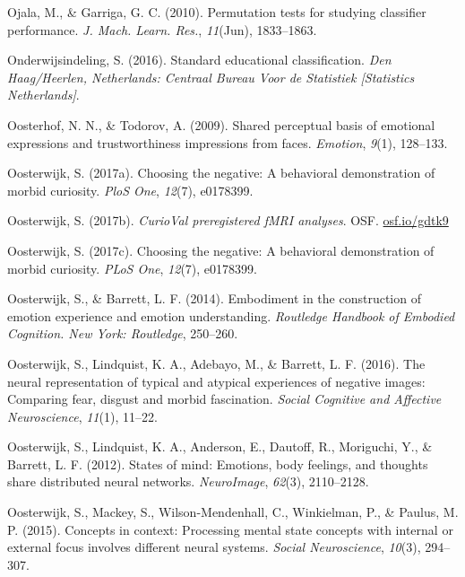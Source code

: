 \documentclass[11pt,american,]{memoir} %
\begin{document}
\leavevmode\hypertarget{ref-Ojala2010-rc}{}%
Ojala, M., \& Garriga, G. C. (2010). Permutation tests for studying classifier performance. \emph{J. Mach. Learn. Res.}, \emph{11}(Jun), 1833--1863.

\leavevmode\hypertarget{ref-Onderwijsindeling2016-tb}{}%
Onderwijsindeling, S. (2016). Standard educational classification. \emph{Den Haag/Heerlen, Netherlands: Centraal Bureau Voor de Statistiek {[}Statistics Netherlands{]}}.

\leavevmode\hypertarget{ref-Oosterhof2009-mf}{}%
Oosterhof, N. N., \& Todorov, A. (2009). Shared perceptual basis of emotional expressions and trustworthiness impressions from faces. \emph{Emotion}, \emph{9}(1), 128--133.

\leavevmode\hypertarget{ref-oosterwijk2017choosing}{}%
Oosterwijk, S. (2017a). Choosing the negative: A behavioral demonstration of morbid curiosity. \emph{PloS One}, \emph{12}(7), e0178399.

\leavevmode\hypertarget{ref-oosterwijk2017prereg}{}%
Oosterwijk, S. (2017b). \emph{CurioVal preregistered fMRI analyses}. OSF. \url{osf.io/gdtk9}

\leavevmode\hypertarget{ref-Oosterwijk2017-dw}{}%
Oosterwijk, S. (2017c). Choosing the negative: A behavioral demonstration of morbid curiosity. \emph{PLoS One}, \emph{12}(7), e0178399.

\leavevmode\hypertarget{ref-oosterwijk2014embodiment}{}%
Oosterwijk, S., \& Barrett, L. F. (2014). Embodiment in the construction of emotion experience and emotion understanding. \emph{Routledge Handbook of Embodied Cognition. New York: Routledge}, 250--260.

\leavevmode\hypertarget{ref-oosterwijk2016neural}{}%
Oosterwijk, S., Lindquist, K. A., Adebayo, M., \& Barrett, L. F. (2016). The neural representation of typical and atypical experiences of negative images: Comparing fear, disgust and morbid fascination. \emph{Social Cognitive and Affective Neuroscience}, \emph{11}(1), 11--22.

\leavevmode\hypertarget{ref-oosterwijk2012states}{}%
Oosterwijk, S., Lindquist, K. A., Anderson, E., Dautoff, R., Moriguchi, Y., \& Barrett, L. F. (2012). States of mind: Emotions, body feelings, and thoughts share distributed neural networks. \emph{NeuroImage}, \emph{62}(3), 2110--2128.

\leavevmode\hypertarget{ref-oosterwijk2015concepts}{}%
Oosterwijk, S., Mackey, S., Wilson-Mendenhall, C., Winkielman, P., \& Paulus, M. P. (2015). Concepts in context: Processing mental state concepts with internal or external focus involves different neural systems. \emph{Social Neuroscience}, \emph{10}(3), 294--307.
\end{document}
